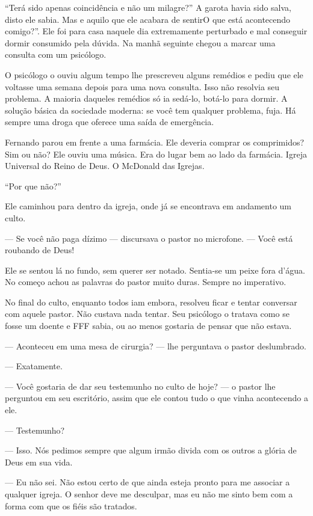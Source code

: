 ``Terá sido apenas coincidência e não um milagre?'' A garota havia sido salva, disto ele sabia. Mas e aquilo que ele acabara de sentirO que está acontecendo comigo?''. Ele foi para casa naquele dia extremamente perturbado e mal conseguir dormir\mudanca{,} consumido pela dúvida. Na manhã seguinte chegou a marcar uma consulta com um psicólogo.

O psicólogo o ouviu algum tempo lhe prescreveu alguns remédios e pediu que ele voltasse uma semana depois para uma nova consulta. Isso não resolvia seu problema. A maioria daqueles remédios só ia sedá-lo, botá-lo para dormir. A solução básica da sociedade moderna: se você tem qualquer problema, fuja. Há sempre uma droga que oferece uma saída de emergência.

Fernando parou em frente a uma farmácia. Ele deveria comprar os comprimidos? Sim ou não? Ele ouviu uma música. Era do lugar bem ao lado da farmácia. Igreja Universal do Reino de Deus. O McDonald das Igrejas.

``Por que não?''

Ele caminhou para dentro da igreja, onde já se encontrava em andamento um culto.

--- Se você não paga dízimo --- discursava o pastor no microfone. --- Você está roubando de Deus!

Ele se sentou lá no fundo, sem querer ser notado. Sentia-se um peixe fora d'água. No começo achou as palavras do pastor muito duras. Sempre no imperativo.

No final do culto, enquanto todos iam embora, resolveu ficar e tentar conversar com aquele pastor. Não custava nada tentar. Seu psicólogo o tratava como se fosse um doente e FFF sabia, ou ao menos gostaria de pensar\mudanca{,} que não estava.

--- Aconteceu em uma mesa de cirurgia? --- lhe perguntava o pastor deslumbrado.

--- Exatamente.

--- Você gostaria de dar seu testemunho no culto de hoje? --- o pastor lhe perguntou em seu escritório, assim que ele contou tudo o que vinha acontecendo a ele.

--- Testemunho?

--- Isso. Nós pedimos sempre que algum irmão divida com os outros a glória de Deus em sua vida.

--- Eu não sei. Não estou certo de que ainda esteja pronto para me associar a qualquer igreja. O senhor deve me desculpar, mas eu não me sinto bem com a forma com que os fiéis são tratados.

